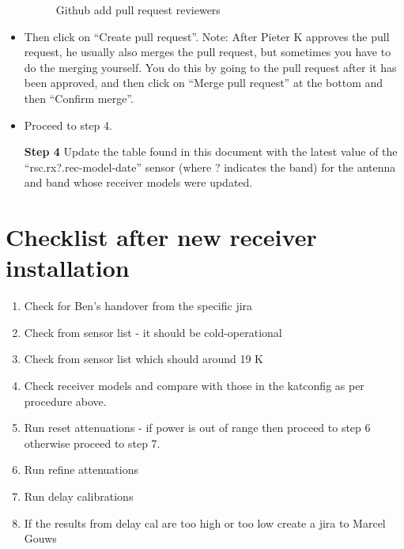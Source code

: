 \begin{itemize}
\begin{figure}[!thb]
	\caption{Github add pull request reviewers }
	\label{fig:image57}
\end{figure}

\item Then click on “Create pull request”. 
Note: After Pieter K approves the pull request, he usually also merges the pull request, but sometimes you have to do the merging yourself. You do this by going to the pull request after it has been approved, and then click on “Merge pull request” at the bottom and then “Confirm merge”.
\item Proceed to step 4.

\item[\textbf{Step 4}]  Update the table found in this document with the latest value of the “rsc.rx?.rec-model-date” sensor (where ? indicates the band) for the antenna and band whose receiver models were updated.
\end{itemize}


\section{ Checklist after new receiver installation}
\begin{enumerate}
	

\item Check for Ben’s handover from the specific jira
\item Check  from sensor list - it should be cold-operational 
\item Check  from sensor list which should around 19 K
\item Check receiver models and compare with those in the katconfig as per procedure above.
\item Run reset attenuations - if power is out of range then proceed to step 6 otherwise proceed to step 7. 
\item Run refine attenuations
\item Run delay calibrations 
\item If the results from delay cal are too high or too low create a jira to Marcel Gouws 
\end{enumerate}

